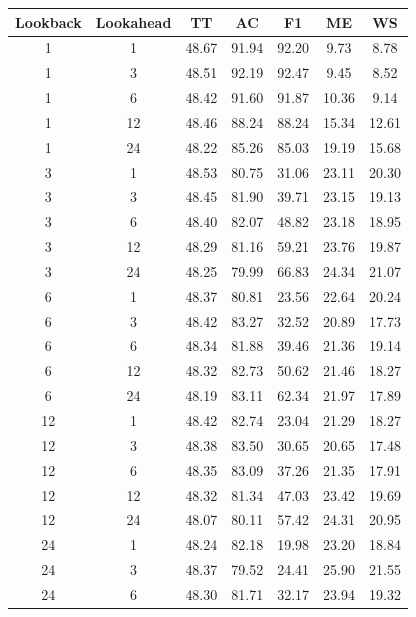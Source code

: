 \newpage
\begin{table}[H]
	\centering
	\begin{tabular}{|c|c||c|c|c|c|c|}
		\hline
		\textbf{Lookback} & \textbf{Lookahead} & \textbf{TT} & \textbf{AC} & \textbf{F1} & \textbf{ME} & \textbf{WS} \\
		\hline \hline
		 1 &  1 & 48.67 & 91.94 & 92.20 &  9.73 &  8.78 \\
		\hline
		 1 &  3 & 48.51 & 92.19 & 92.47 &  9.45 &  8.52 \\
		\hline
		 1 &  6 & 48.42 & 91.60 & 91.87 & 10.36 &  9.14 \\
		\hline
		 1 & 12 & 48.46 & 88.24 & 88.24 & 15.34 & 12.61 \\
		\hline
		 1 & 24 & 48.22 & 85.26 & 85.03 & 19.19 & 15.68 \\
		\hline
		 3 &  1 & 48.53 & 80.75 & 31.06 & 23.11 & 20.30 \\
		\hline
		 3 &  3 & 48.45 & 81.90 & 39.71 & 23.15 & 19.13 \\
		\hline
		 3 &  6 & 48.40 & 82.07 & 48.82 & 23.18 & 18.95 \\
		\hline
		 3 & 12 & 48.29 & 81.16 & 59.21 & 23.76 & 19.87 \\
		\hline
		 3 & 24 & 48.25 & 79.99 & 66.83 & 24.34 & 21.07 \\
		\hline
		 6 &  1 & 48.37 & 80.81 & 23.56 & 22.64 & 20.24 \\
		\hline
		 6 &  3 & 48.42 & 83.27 & 32.52 & 20.89 & 17.73 \\
		\hline
		 6 &  6 & 48.34 & 81.88 & 39.46 & 21.36 & 19.14 \\
		\hline
		 6 & 12 & 48.32 & 82.73 & 50.62 & 21.46 & 18.27 \\
		\hline
		 6 & 24 & 48.19 & 83.11 & 62.34 & 21.97 & 17.89 \\
		\hline
		12 &  1 & 48.42 & 82.74 & 23.04 & 21.29 & 18.27 \\
		\hline
		12 &  3 & 48.38 & 83.50 & 30.65 & 20.65 & 17.48 \\
		\hline
		12 &  6 & 48.35 & 83.09 & 37.26 & 21.35 & 17.91 \\
		\hline
		12 & 12 & 48.32 & 81.34 & 47.03 & 23.42 & 19.69 \\
		\hline
		12 & 24 & 48.07 & 80.11 & 57.42 & 24.31 & 20.95 \\
		\hline
		24 &  1 & 48.24 & 82.18 & 19.98 & 23.20 & 18.84 \\
		\hline
		24 &  3 & 48.37 & 79.52 & 24.41 & 25.90 & 21.55 \\
		\hline
		24 &  6 & 48.30 & 81.71 & 32.17 & 23.94 & 19.32 \\

\end{tabular}
\end{table}
